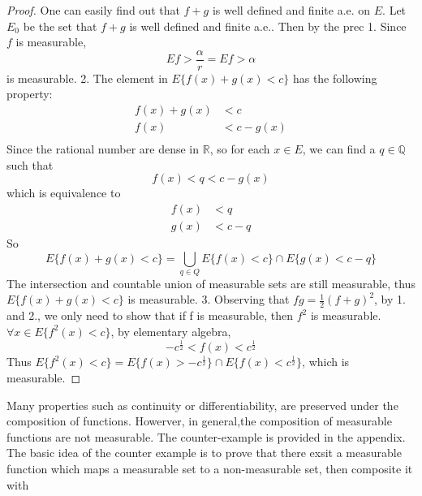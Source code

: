 \documentclass[lang=en, 12pt]{elegantbook}
\newcommand{\RR}{\mathbb{R}}
\newcommand{\QQ}{\mathbb{Q}}
\begin{document}
            \begin{proof}
                One can easily find out that $f + g$ is well defined and finite a.e. on $E$. Let $E_0$ be the set that $f + g$ is well defined and 
            finite a.e.. Then by the prec
                1. Since $f$ is measurable, 
            $$E{f>\frac{\alpha}{r}} = E{f>\alpha}$$ is measurable.
                2. The element in $E\{f(x)+g(x) < c\}$ has the following property:
                \begin{equation*}
                    \begin{aligned}
                        f(x) + g(x) &< c\\
                        f(x) &< c - g(x)\\
                    \end{aligned}
                \end{equation*}
                Since the rational number are dense in $\RR$, so for each $x \in E$, we can find a $q \in \QQ$ such that
                $$f(x) < q < c-g(x)$$
                which is equivalence to 
                \begin{equation*}
                    \begin{aligned}
                        f(x) &< q \\
                        g(x) &< c-q
                    \end{aligned}
                \end{equation*}
                So 
                $$ E\{f(x) + g(x) < c \} = \bigcup_{q \in Q} E\{f(x) < c\} \cap E\{g(x) < c-q\}$$
                The intersection and countable union of measurable sets are still measurable, thus $E\{f(x) + g(x) < c \}$ is measurable.
                3. Observing that $fg = \frac{1}{2} (f + g)^2$, by 1. and 2., we only need to show that if f is measurable, then $f^2$ is 
            measurable. $\forall x \in E\{f^2(x)< c\}$, by elementary algebra, 
            $$-c^{\frac{1}{2}}< f(x)<c^{\frac{1}{2}}$$
            Thus $E\{f^2(x)<c\} = E\{f(x) > -c^{\frac{1}{2}}\} \cap E\{f(x)<c^{\frac{1}{2}}\}$, which is measurable. 
            \end{proof}
            Many properties such as continuity or differentiability, are preserved under the composition of functions. Howerver, in general,the 
        composition of measurable functions are not measurable. The counter-example is provided in the appendix. The basic idea of the counter 
        example is to prove that there exsit a measurable function which maps a measurable set to a non-measurable set, then composite it with
\end{document}
